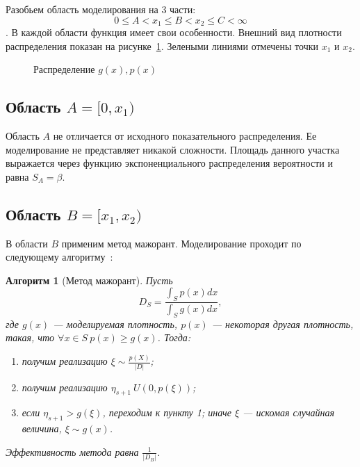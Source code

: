 \documentclass[12pt, specialist, subf, substylefile = spbu.rtx]{disser}
\newtheorem{algo}{Алгоритм}
\begin{document}
Разобьем область моделирования на 3 части: 
$$0 \le A < x_1 \le B < x_2 \le C < \infty$$.
В каждой области функция имеет свои особенности. Внешний вид плотности распределения показан на рисунке~\ref{ris:plot}. Зелеными линиями отмечены точки $x_1$ и $x_2$.

\begin{figure}[h]
\caption{Распределение $g(x), p(x)$}
\label{ris:plot}
\end{figure}



\subsection{Область $A=[0, x_1)$}

Область $A$ не отличается от исходного показательного распределения. Ее моделирование не представляет никакой сложности. Площадь данного участка выражается через функцию экспоненциального распределения вероятности и равна $S_A=\beta$.


\subsection{Область $B=[x_1, x_2)$}

В области $B$ применим метод мажорант. Моделирование проходит по следующему алгоритму~\cite{MonErm}:
\begin{algo}[Метод мажорант]
Пусть 
$$D_S=\frac{\int_S p(x) dx}{\int_S g(x) dx},$$
где $g(x)$ --- моделируемая плотность, $p(x)$ --- некоторая другая плотность, такая, что $\forall x \in S \ p(x) \ge g(x)$. Тогда:
\begin{enumerate}
\item получим реализацию $\xi \sim \frac{p(X)}{|D|}$;
\item получим реализацию $\eta_{s+1} ~U(0, p(\xi))$;
\item если $\eta_{s+1} > g(\xi)$, переходим к пункту 1; иначе $\xi$ --- искомая случайная величина, $\xi \sim g(x)$.
\end{enumerate}
Эффективность метода равна $\frac{1}{|D_B|}$.
\end{algo}
\end{document}
